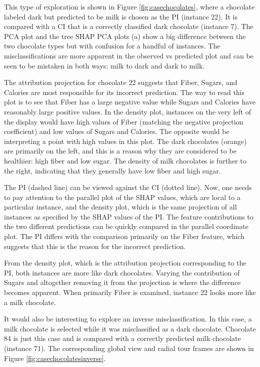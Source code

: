 \documentclass[
]{article}
\begin{document}
This type of exploration is shown in Figure \ref{fig:casechocolates}, where a chocolate labeled dark but predicted to be milk is chosen as the PI (instance 22). It is compared with a CI that is a correctly classified dark chocolate (instance 7). The PCA plot and the tree SHAP PCA plots (a) show a big difference between the two chocolate types but with confusion for a handful of instances. The misclassifications are more apparent in the observed vs predicted plot and can be seen to be mistaken in both ways: milk to dark and dark to milk.

The attribution projection for chocolate 22 suggests that Fiber, Sugars, and Calories are most responsible for its incorrect prediction. The way to read this plot is to see that Fiber has a large negative value while Sugars and Calories have reasonably large positive values. In the density plot, instances on the very left of the display would have high values of Fiber (matching the negative projection coefficient) and low values of Sugars and Calories. The opposite would be interpreting a point with high values in this plot. The dark chocolates (orange) are primarily on the left, and this is a reason why they are considered to be healthier: high fiber and low sugar. The density of milk chocolates is further to the right, indicating that they generally have low fiber and high sugar.

The PI (dashed line) can be viewed against the CI (dotted line). Now, one needs to pay attention to the parallel plot of the SHAP values, which are local to a particular instance, and the density plot, which is the same projection of all instances as specified by the SHAP values of the PI. The feature contributions to the two different predictions can be quickly compared in the parallel coordinate plot. The PI differs with the comparison primarily on the Fiber feature, which suggests that this is the reason for the incorrect prediction.

From the density plot, which is the attribution projection corresponding to the PI, both instances are more like dark chocolates. Varying the contribution of Sugars and altogether removing it from the projection is where the difference becomes apparent. When primarily Fiber is examined, instance 22 looks more like a milk chocolate.

It would also be interesting to explore an inverse misclassification. In this case, a milk chocolate is selected while it was misclassified as a dark chocolate. Chocolate 84 is just this case and is compared with a correctly predicted milk chocolate (instance 71). The corresponding global view and radial tour frames are shown in Figure \ref{fig:casechocolatesinverse}.
\end{document}
